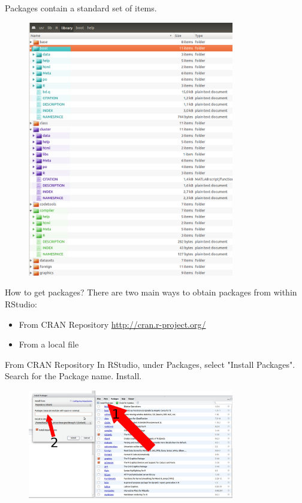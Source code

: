 \documentclass{beamer}\usepackage[]{graphicx}\usepackage[]{color}
\begin{document}
\begin{frame}[fragile]{Packages contain a standard set of items.}
\begin{figure}[ht!]
\centering
\includegraphics[width=90mm]{pictures/library_screenCap_colorized.png}
\label{overflow}
\end{figure}
\end{frame}


\begin{frame}[fragile]{How to get packages?}
There are two main ways to obtain packages from within RStudio:
\begin{itemize}
\item From CRAN Repository \url{http://cran.r-project.org/}
\item From a local file
\end{itemize}

\end{frame}

\begin{frame}[fragile]{From CRAN Repository}
In RStudio, under Packages, select "Install Packages". Search for the Package name. Install.
\begin{figure}[ht!]
\centering
\includegraphics[width=90mm]{pictures/package_install_CRAN.png}
\label{overflow}
\end{figure}
\end{frame}
\end{document}
